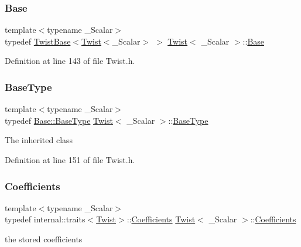 \subsubsection{\texorpdfstring{Base}{Base}}
{\footnotesize\ttfamily template$<$typename \+\_\+\+Scalar$>$ \\
typedef \hyperlink{class_twist_base}{Twist\+Base}$<$\hyperlink{class_twist}{Twist}$<$\+\_\+\+Scalar$>$ $>$ \hyperlink{class_twist}{Twist}$<$ \+\_\+\+Scalar $>$\+::\hyperlink{class_twist_a83c55648035a111abdce59e32880a710}{Base}\hspace{0.3cm}{\ttfamily [protected]}}



Definition at line 143 of file Twist.\+h.

\hypertarget{class_twist_ab1df1af2243738177191f6c23123f3be}{}\label{class_twist_ab1df1af2243738177191f6c23123f3be} 
\subsubsection{\texorpdfstring{Base\+Type}{BaseType}}
{\footnotesize\ttfamily template$<$typename \+\_\+\+Scalar$>$ \\
typedef \hyperlink{class_twist_base_a4086aa35326778872a7d0f0bfdfcc0ec}{Base\+::\+Base\+Type} \hyperlink{class_twist}{Twist}$<$ \+\_\+\+Scalar $>$\+::\hyperlink{class_twist_ab1df1af2243738177191f6c23123f3be}{Base\+Type}}

The inherited class 

Definition at line 151 of file Twist.\+h.

\hypertarget{class_twist_a1bc0976a0f06b366421639350134222b}{}\label{class_twist_a1bc0976a0f06b366421639350134222b} 
\subsubsection{\texorpdfstring{Coefficients}{Coefficients}}
{\footnotesize\ttfamily template$<$typename \+\_\+\+Scalar$>$ \\
typedef internal\+::traits$<$\hyperlink{class_twist}{Twist}$>$\+::\hyperlink{class_twist_a1bc0976a0f06b366421639350134222b}{Coefficients} \hyperlink{class_twist}{Twist}$<$ \+\_\+\+Scalar $>$\+::\hyperlink{class_twist_a1bc0976a0f06b366421639350134222b}{Coefficients}}

the stored coefficients 

